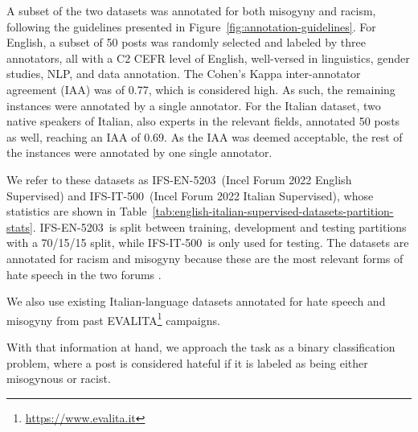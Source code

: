 \documentclass[11pt]{article}
\newcommand{\dsENclassification}{IFS-EN-5203}
\newcommand{\dsITclassification}{IFS-IT-500}
\begin{document}
A subset of the two datasets was annotated for both misogyny and racism, following the guidelines presented in Figure~\ref{fig:annotation-guidelines}.
For English, a subset of 50 posts was randomly selected and labeled by three annotators, all with a C2 CEFR level of English, well-versed in linguistics, gender studies, NLP, and data annotation. 
The Cohen's Kappa inter-annotator agreement (IAA) \cite{bobicev2017inter} was of 0.77, which is considered high.
As such, the remaining instances were annotated by a single annotator. For the Italian dataset, two native speakers of Italian, also experts in the relevant fields, annotated  50 posts as well, reaching an IAA of 0.69. As the IAA was deemed acceptable, the rest of the instances were annotated by one single annotator. 

We refer to these datasets as \dsENclassification\, (Incel Forum 2022 English Supervised) and \dsITclassification\, (Incel Forum 2022 Italian Supervised), 
whose statistics are shown in 
Table~\ref{tab:english-italian-supervised-datasets-partition-stats}. \dsENclassification~is split between training, development and testing partitions with a 70/15/15 split, while \dsITclassification~is only used for testing.
The datasets are annotated for racism and misogyny because these are the most relevant forms of hate speech in the two forums \cite{silva2016analyzing,ging2018special}.

We also use existing Italian-language datasets annotated for hate speech \cite{boscoOverviewEVALITA2018} and misogyny \cite{basileEVALITA2020Overview} from past EVALITA\footnote{\url{https://www.evalita.it}} campaigns.

With that information at hand, we approach the task as a binary classification problem, where a post is considered hateful if it is labeled as being either misogynous or racist.
\end{document}

